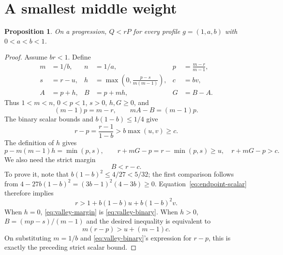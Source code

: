 \documentclass[11pt,a4paper]{article}
\newtheorem{proposition}[theorem]{Proposition}
\theoremstyle{remark}
\begin{document}
\section{A smallest middle weight}\label{sec:valley}

\begin{proposition}\label{prop:valley}
On a progression, $Q<rP$ for every profile
$g=(1,a,b)$ with $0<a<b<1$.
\end{proposition}

\begin{proof}
Assume $br<1$. Define
\begin{align*}
 m&=1/b,&n&=1/a,&p&=\frac{m-r}{m-1},\\
 s&=r-u,&h&=\max\left(0,\frac{p-s}{m(m-1)}\right),&c&=bv,\\
 A&=p+h,&B&=p+mh,&G&=B-A.
\end{align*}
Thus $1<m<n$, $0<p<1$, $s>0$, $h,G\ge0$, and
\begin{equation}\label{eq:valley-identities}
 (m-1)p=m-r,\qquad mA-B=(m-1)p.
\end{equation}
The binary scalar bounds and $b(1-b)\le1/4$ give
\begin{equation}\label{eq:valley-binary}
 r-p=\frac{r-1}{1-b}>b\max(u,v)\ge c.
\end{equation}
The definition of $h$ gives
\begin{equation}\label{eq:valley-middle}
 p-m(m-1)h=\min(p,s),\qquad
 r+mG-p=r-\min(p,s)\ge u,\quad r+mG-p>c.
\end{equation}
We also need the strict margin
\begin{equation}\label{eq:valley-margin}
 B<r-c.
\end{equation}
To prove it, note that $b(1-b)^2\le4/27<5/32$; the first comparison
follows from
$4-27b(1-b)^2=(3b-1)^2(4-3b)\ge0$.
Equation~\eqref{eq:endpoint-scalar} therefore implies
\[
 r>1+b(1-b)u+b(1-b)^2v.
\]
When $h=0$, \eqref{eq:valley-margin} is \eqref{eq:valley-binary}.
When $h>0$, $B=(mp-s)/(m-1)$ and the desired inequality is equivalent to
\[
 m(r-p)>u+(m-1)c.
\]
On substituting $m=1/b$ and \eqref{eq:valley-binary}'s expression for
$r-p$, this is exactly the preceding strict scalar bound.


\end{proof}
\end{document}
